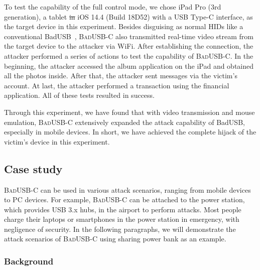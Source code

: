 \documentclass[conference]{IEEEtran}
\newcommand{\tool}{\mbox{\textsc{BadUSB-C}}\xspace}
\providecommand{\DIFaddtex}[1]{{\protect\color{blue}\uwave{#1}}} %
\providecommand{\DIFdeltex}[1]{{\protect\color{red}\sout{#1}}}                      %
\providecommand{\DIFaddbegin}{} %
\providecommand{\DIFaddend}{} %
\providecommand{\DIFdelbegin}{} %
\providecommand{\DIFdelend}{} %
\providecommand{\DIFadd}[1]{\texorpdfstring{\DIFaddtex{#1}}{#1}} %
\providecommand{\DIFdel}[1]{\texorpdfstring{\DIFdeltex{#1}}{}} %
\newcommand{\DIFscaledelfig}{0.5}
\newlength{\DIFdelgraphicswidth} %
\newlength{\DIFdelgraphicsheight} %
\newcommand{\DIFaddincludegraphics}[2][]{{\color{blue}\fbox{\DIFOincludegraphics[#1]{#2}}}} %
\newcommand{\DIFdelincludegraphics}[2][]{%
\sbox{\DIFdelgraphicsbox}{\DIFOincludegraphics[#1]{#2}}%
\settoboxwidth{\DIFdelgraphicswidth}{\DIFdelgraphicsbox} %
\settoboxtotalheight{\DIFdelgraphicsheight}{\DIFdelgraphicsbox} %
\scalebox{\DIFscaledelfig}{%
\parbox[b]{\DIFdelgraphicswidth}{\usebox{\DIFdelgraphicsbox}\\[-\baselineskip] \rule{\DIFdelgraphicswidth}{0em}}\llap{\resizebox{\DIFdelgraphicswidth}{\DIFdelgraphicsheight}{%
\setlength{\unitlength}{\DIFdelgraphicswidth}%
\begin{picture}(1,1)%
\thicklines\linethickness{2pt} %
{\color[rgb]{1,0,0}\put(0,0){\framebox(1,1){}}}%
{\color[rgb]{1,0,0}\put(0,0){\line( 1,1){1}}}%
{\color[rgb]{1,0,0}\put(0,1){\line(1,-1){1}}}%
\end{picture}%
}\hspace*{3pt}}} %
} %
\DeclareRobustCommand{\DIFaddbegin}{\DIFOaddbegin \let\includegraphics\DIFaddincludegraphics} %
\DeclareRobustCommand{\DIFaddend}{\DIFOaddend \let\includegraphics\DIFOincludegraphics} %
\DeclareRobustCommand{\DIFdelbegin}{\DIFOdelbegin \let\includegraphics\DIFdelincludegraphics} %
\DeclareRobustCommand{\DIFdelend}{\DIFOaddend \let\includegraphics\DIFOincludegraphics} %
\begin{document}
To test the capability of the full control mode, we chose iPad Pro (3rd
	generation), a tablet \DIFdelbegin \DIFdel{in }\DIFdelend \DIFaddbegin \DIFadd{running }\DIFaddend iOS 14.4 (Build 18D52) with a \ac{USB} Type-C interface, as the target
device in this experiment.  Besides disguising \DIFaddbegin \DIFadd{themself }\DIFaddend as normal \acp{HID} like a
conventional BadUSB~\cite{badusb}, \tool also transmitted real-time video
stream from the target device to the attacker via WiFi.  After establishing the connection, the attacker performed a series of actions to test the capability of
\tool. In the beginning, the attacker accessed the album application on the iPad and
obtained all the photos inside. After that, the attacker sent messages via the victim's
account. At last, the attacker performed a transaction using the
financial application. All of these tests resulted in success.

Through this experiment, we have found that with video transmission and mouse
emulation, \tool extensively expanded the attack capability of BadUSB,
especially in mobile devices. In short, we have achieved the complete hijack of the victim's
device in this experiment.

\subsection{Case study}
\label{subsec:case_study}
\tool can be used in various attack scenarios, ranging from mobile devices to PC devices.
For example, \tool can be attached to the power station, which provides USB 3.x hubs, in the airport to perform attacks.
Most people charge their laptops or smartphones in the power station in emergency, with negligence of security.
In the following paragraphs, we will demonstrate the attack scenarios of \tool using sharing power bank as an example.

\subsubsection{Background}
\end{document}
